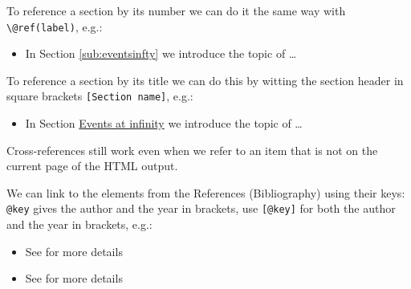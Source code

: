 \documentclass[
]{book}
\providecommand{\tightlist}{%
  \setlength{\itemsep}{0pt}\setlength{\parskip}{0pt}}
\theoremstyle{definition}
\theoremstyle{definition}
\theoremstyle{definition}
\theoremstyle{definition}
\theoremstyle{remark}
\begin{document}
To reference a section by its number we can do it the same way with \texttt{\textbackslash{}@ref(label)}, e.g.:

\begin{itemize}
\tightlist
\item
  In Section \ref{sub:eventsinfty} we introduce the topic of \ldots{}
\end{itemize}

To reference a section by its title we can do this by witting the section
header in square brackets \texttt{{[}Section\ name{]}}, e.g.:

\begin{itemize}
\tightlist
\item
  In Section \protect\hyperlink{sub:eventsinfty}{Events at infinity} we introduce the topic of \ldots{}
\end{itemize}

Cross-references still work even when we refer to an item that is not on the
current page of the HTML output.

We can link to the elements from the References (Bibliography) using their keys:
\texttt{@key} gives the author and the year in brackets, use \texttt{{[}@key{]}} for both the
author and the year in brackets, e.g.:

\begin{itemize}
\tightlist
\item
  See \citet{Cohn13} for more details
\item
  See \citep{Cohn13} for more details
\end{itemize}

\backmatter

  
\end{document}
